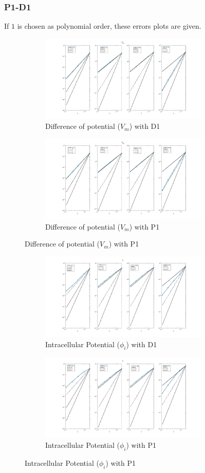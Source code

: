 \documentclass[a4paper,11pt]{article}
\begin{document}
\subsubsection{P1-D1}
If $1$ is chosen as polynomial order, these errors plots are given. 
\begin{figure}[h]
\begin{subfigure}{0.5\textwidth}
\includegraphics[width = 8cm]{./D1_Vm_1.jpg}
\caption*{Difference of potential ($V_m$) with D1}
\label{Vm_D1}
\end{subfigure}
\begin{subfigure}{0.5\textwidth}
\includegraphics[width =8cm]{./P1_Vm_1.jpg}
\caption*{Difference of potential ($V_m$) with P1}
\label{Vm_P1}
\end{subfigure}
\end{figure}
\begin{figure}[h]
\begin{subfigure}{0.5\textwidth}
\includegraphics[width = 8cm]{./D1_Phii_1.jpg}
\caption*{Intracellular Potential ($\phi_i$) with D1}
\label{Phii_D1}
\end{subfigure}
\begin{subfigure}{0.5\textwidth}
\includegraphics[width =8cm]{./P1_Phii_1.jpg}
\caption*{Intracellular Potential ($\phi_i$) with P1}
\label{Phii_P1}
\end{subfigure}
\end{figure}
\end{document}
